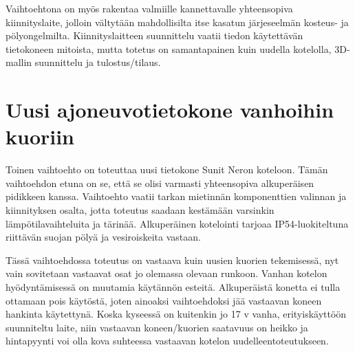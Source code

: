 Vaihtoehtona on myös rakentaa valmiille kannettavalle yhteensopiva kiinnityslaite, jolloin vältytään mahdollisilta itse kasatun järjeseelmän kosteus- ja pölyongelmilta. Kiinnityslaitteen suunnittelu vaatii tiedon käytettävän tietokoneen mitoista, mutta totetus on samantapainen kuin uudella kotelolla, 3D-mallin suunnittelu ja tulostus/tilaus.



\section{Uusi ajoneuvotietokone vanhoihin kuoriin}


Toinen vaihtoehto on toteuttaa uusi tietokone Sunit Neron koteloon. Tämän vaihtoehdon etuna on se, että se olisi varmasti yhteensopiva alkuperäisen pidikkeen kanssa. Vaihtoehto vaatii tarkan mietinnän komponenttien valinnan ja kiinnityksen osalta, jotta toteutus saadaan kestämään varsinkin lämpötilavaihteluita ja tärinää. Alkuperäinen kotelointi tarjoaa IP54-luokiteltuna riittävän suojan pölyä ja vesiroiskeita vastaan.

Tässä vaihtoehdossa toteutus on vastaava kuin uusien kuorien tekemisessä, nyt vain sovitetaan vastaavat osat jo olemassa olevaan runkoon. Vanhan kotelon hyödyntämisessä on muutamia käytännön esteitä. Alkuperäistä konetta ei tulla ottamaan pois käytöstä, joten ainoaksi vaihtoehdoksi jää vastaavan koneen hankinta käytettynä. Koska kyseessä on kuitenkin jo 17 v vanha, erityiskäyttöön suunniteltu laite, niin vastaavan koneen/kuorien saatavuus on heikko ja hintapyynti voi olla kova suhteessa vastaavan kotelon uudelleentoteutukseen.


